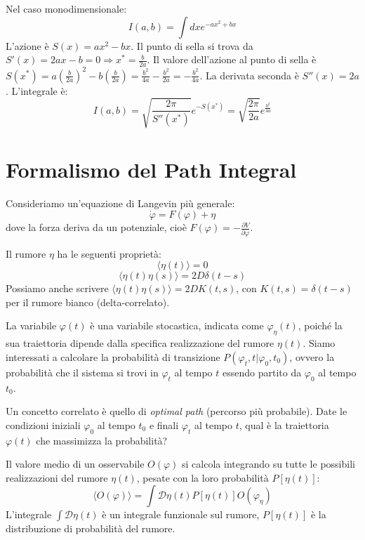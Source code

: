 Nel caso monodimensionale:
\begin{equation}
I(a,b) = \int dx e^{-ax^2 + bx}
\end{equation}
L'azione è $S(x) = ax^2 - bx$.
Il punto di sella si trova da $S'(x) = 2ax - b = 0 \Rightarrow x^* = \frac{b}{2a}$.
Il valore dell'azione al punto di sella è $S(x^*) = a \left(\frac{b}{2a}\right)^2 - b \left(\frac{b}{2a}\right) = \frac{b^2}{4a} - \frac{b^2}{2a} = -\frac{b^2}{4a}$.
La derivata seconda è $S''(x) = 2a$.
L'integrale è:
\begin{equation}
I(a,b) = \sqrt{\frac{2\pi}{S''(x^*)}} e^{-S(x^*)} = \sqrt{\frac{2\pi}{2a}} e^{\frac{b^2}{4a}}
\end{equation}

\section{Formalismo del Path Integral}
Consideriamo un'equazione di Langevin più generale:
\begin{equation}
\dot{\varphi} = F(\varphi) + \eta
\end{equation}
dove la forza deriva da un potenziale, cioè $F(\varphi) = -\frac{\partial V}{\partial \varphi}$.

Il rumore $\eta$ ha le seguenti proprietà:
\begin{equation}
\langle \eta(t) \rangle = 0
\end{equation}
\begin{equation}
\langle \eta(t) \eta(s) \rangle = 2D \delta(t-s)
\end{equation}
Possiamo anche scrivere $\langle \eta(t) \eta(s) \rangle = 2D K(t,s)$, con $K(t,s) = \delta(t-s) $ per il rumore bianco (delta-correlato).

La variabile $\varphi(t)$ è una variabile stocastica, indicata come $\varphi_{\eta}(t)$, poiché la sua traiettoria dipende dalla specifica realizzazione del rumore $\eta(t)$. Siamo interessati a calcolare la probabilità di transizione $P(\varphi_t, t | \varphi_0, t_0)$, ovvero la probabilità che il sistema si trovi in $\varphi_t$ al tempo $t$ essendo partito da $\varphi_0$ al tempo $t_0$.

Un concetto correlato è quello di \textit{optimal path} (percorso più probabile). Date le condizioni iniziali $\varphi_0$ al tempo $t_0$ e finali $\varphi_t$ al tempo $t$, qual è la traiettoria $\varphi(t)$ che massimizza la probabilità?

Il valore medio di un osservabile $O(\varphi)$ si calcola integrando su tutte le possibili realizzazioni del rumore $\eta(t)$, pesate con la loro probabilità $P[\eta(t)]$:
\begin{equation}
\langle O(\varphi) \rangle = \int \mathcal{D}\eta(t) P[\eta(t)] O(\varphi_{\eta})
\end{equation}
L'integrale $\int \mathcal{D}\eta(t)$ è un integrale funzionale sul rumore, $P[\eta(t)]$ è la distribuzione di probabilità del rumore.

